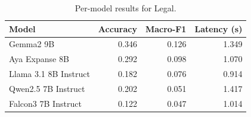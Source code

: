 \begin{table}[t]
\centering
\caption{Per-model results for Legal.}
\label{tab:appendix-legal-classification-analysis}
\begin{tabular}{lrrr}
\toprule
Model & Accuracy & Macro-F1 & Latency (s) \\
\midrule
Gemma2 9B & 0.346 & 0.126 & 1.349 \\
Aya Expanse 8B & 0.292 & 0.098 & 1.070 \\
Llama 3.1 8B Instruct & 0.182 & 0.076 & 0.914 \\
Qwen2.5 7B Instruct & 0.202 & 0.051 & 1.417 \\
Falcon3 7B Instruct & 0.122 & 0.047 & 1.014 \\
\bottomrule
\end{tabular}
\end{table}
